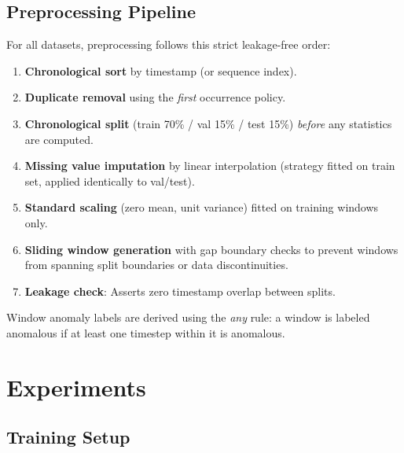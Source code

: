 \documentclass[10pt,twocolumn]{article}
\begin{document}
\subsection{Preprocessing Pipeline}

For all datasets, preprocessing follows this strict leakage-free order:
\begin{enumerate}[leftmargin=*, topsep=2pt, itemsep=2pt]
    \item \textbf{Chronological sort} by timestamp (or sequence index).
    \item \textbf{Duplicate removal} using the \textit{first} occurrence policy.
    \item \textbf{Chronological split} (train 70\% / val 15\% / test 15\%) \emph{before} any statistics are computed.
    \item \textbf{Missing value imputation} by linear interpolation (strategy fitted on train set, applied identically to val/test).
    \item \textbf{Standard scaling} (zero mean, unit variance) fitted on training windows only.
    \item \textbf{Sliding window generation} with gap boundary checks to prevent windows from spanning split boundaries or data discontinuities.
    \item \textbf{Leakage check}: Asserts zero timestamp overlap between splits.
\end{enumerate}

Window anomaly labels are derived using the \textit{any} rule: a window is labeled anomalous if at least one timestep within it is anomalous.

\section{Experiments}
\label{sec:experiments}

\subsection{Training Setup}
\end{document}
